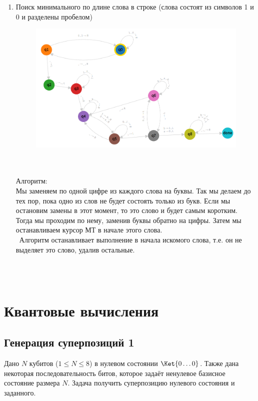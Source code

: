 \documentclass{article}
\begin{document}
\begin{enumerate}
\newpage
    \item Поиск минимального по длине слова в строке (слова состоят из символов 1 и 0 и разделены пробелом)
   \begin{figure}[h]
        \centering
        \includegraphics[width=15cm]{pictures/2.3.png}
   \end{figure}\\ \\
   
Алгоритм:\\
Мы заменяем по одной цифре из каждого слова на буквы. Так мы делаем до тех пор, пока одно из слов не будет состоять только из букв. Если мы остановим замены в этот момент, то это слово и будет самым коротким. Тогда мы проходим по нему, заменив буквы обратно на цифры. Затем мы останавливаем курсор МТ в начале этого слова.
\\ 
\ Алгоритм останавливает выполнение в начала искомого слова, т.е. он не выделяет это слово, удалив остальные.
\\ \\
\end{enumerate}\\


\section{Квантовые вычисления}

\subsection{Генерация суперпозиций 1}

Дано $N$ кубитов ($1 \le N \le 8$) в нулевом состоянии $\Ket{0\dots0}$. Также дана некоторая последовательность битов, которое задаёт ненулевое базисное состояние размера $N$. Задача получить суперпозицию нулевого состояния и заданного.
\end{document}
